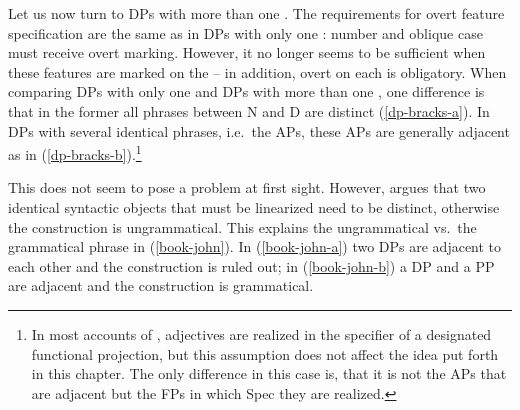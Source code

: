 \documentclass[output=paper,colorlinks,citecolor=brown]{langscibook}
\begin{document}
\ea
{}
\z 
\z 

Let us now turn to DPs with more than one . The requirements for overt feature specification are the same as in DPs with only one : number and oblique case must receive overt marking. However, it no longer seems to be sufficient when these features are marked on the  -- in addition, overt  on each  is obligatory. When comparing DPs with only one  and DPs with more than one , one difference is that in the former all phrases between N and D are distinct (\ref{dp-bracks-a}). In DPs with several identical phrases, i.e.~the APs, these APs are generally adjacent as in (\ref{dp-bracks-b}).\footnote{In most accounts of , adjectives are realized in the specifier of a designated functional projection, but this assumption does not affect the idea put forth in this chapter. The only difference in this case is, that it is not the APs that are adjacent but the FPs in which Spec they are realized.}


\ea
{}
\z 
\z

This does not seem to pose a problem at first sight. However, \citet[5]{richards2010uttering} argues that two identical syntactic objects that must be linearized need to be distinct, otherwise the construction is ungrammatical. This explains the ungrammatical vs.~the grammatical phrase in (\ref{book-john}). In (\ref{book-john-a}) two DPs are adjacent to each other and the construction is ruled out; in (\ref{book-john-b}) a DP and a PP are adjacent and the construction is grammatical.

\ea\label{book-john}
\z
\z
\end{document}
